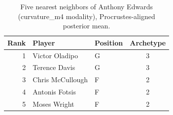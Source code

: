 \begin{table}[htbp]
  \centering\small
  \begin{tabular}{rllc}
    \toprule
    Rank & Player & Position & Archetype \\
    \midrule
    1 & Victor Oladipo & G & 3 \\
    2 & Terence Davis & G & 3 \\
    3 & Chris McCullough & F & 2 \\
    4 & Antonis Fotsis & F & 2 \\
    5 & Moses Wright & F & 2 \\
    \bottomrule
  \end{tabular}
  \caption{Five nearest neighbors of Anthony Edwards (curvature_m4 modality), Procrustes-aligned posterior mean.}
  \label{tab:Anthony_Edwards_neighbors_curvature_m4}
\end{table}

